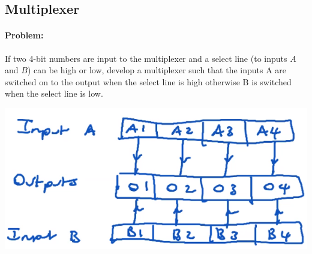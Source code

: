 \documentclass[12pt, a4paper]{report}
\begin{document}
\subsection{Multiplexer}
\paragraph*{Problem: } If two 4-bit numbers are input to the multiplexer and a select line (to inputs $A$ and $B$) can be high or low, develop a multiplexer such that the inputs A are switched on to the output when the select line is high otherwise B is switched when the select line is low.\\ 
\begin{center}
	\includegraphics[scale=0.5]{multiplexer}
	
\end{center}

\newpage
\end{document}
